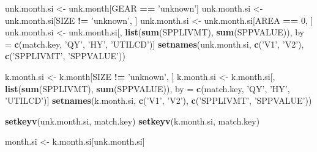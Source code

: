 \documentclass[]{article}
\newenvironment{Shaded}{\begin{snugshade}}{\end{snugshade}}
\newcommand{\KeywordTok}[1]{\textcolor[rgb]{0.13,0.29,0.53}{\textbf{#1}}}
\newcommand{\DecValTok}[1]{\textcolor[rgb]{0.00,0.00,0.81}{#1}}
\newcommand{\StringTok}[1]{\textcolor[rgb]{0.31,0.60,0.02}{#1}}
\newcommand{\OperatorTok}[1]{\textcolor[rgb]{0.81,0.36,0.00}{\textbf{#1}}}
\newcommand{\NormalTok}[1]{#1}
\begin{document}
\begin{Shaded}
\begin{Highlighting}[]
\NormalTok{  unk.month.si <-}\StringTok{ }\NormalTok{unk.month[GEAR }\OperatorTok{==}\StringTok{ 'unknown'}\NormalTok{]}
\NormalTok{  unk.month.si <-}\StringTok{ }\NormalTok{unk.month.si[SIZE }\OperatorTok{!=}\StringTok{ 'unknown'}\NormalTok{, ]}
\NormalTok{  unk.month.si <-}\StringTok{ }\NormalTok{unk.month.si[AREA }\OperatorTok{==}\StringTok{ }\DecValTok{0}\NormalTok{, ]}
\NormalTok{  unk.month.si <-}\StringTok{ }\NormalTok{unk.month.si[, }\KeywordTok{list}\NormalTok{(}\KeywordTok{sum}\NormalTok{(SPPLIVMT), }\KeywordTok{sum}\NormalTok{(SPPVALUE)), }
\NormalTok{                               by =}\StringTok{ }\KeywordTok{c}\NormalTok{(match.key, }\StringTok{'QY'}\NormalTok{, }\StringTok{'HY'}\NormalTok{, }\StringTok{'UTILCD'}\NormalTok{)]}
  \KeywordTok{setnames}\NormalTok{(unk.month.si, }\KeywordTok{c}\NormalTok{(}\StringTok{'V1'}\NormalTok{, }\StringTok{'V2'}\NormalTok{), }\KeywordTok{c}\NormalTok{(}\StringTok{'SPPLIVMT'}\NormalTok{, }\StringTok{'SPPVALUE'}\NormalTok{))}
  
\NormalTok{  k.month.si <-}\StringTok{ }\NormalTok{k.month[SIZE }\OperatorTok{!=}\StringTok{ 'unknown'}\NormalTok{, ]}
\NormalTok{  k.month.si <-}\StringTok{ }\NormalTok{k.month.si[, }\KeywordTok{list}\NormalTok{(}\KeywordTok{sum}\NormalTok{(SPPLIVMT), }\KeywordTok{sum}\NormalTok{(SPPVALUE)), }
\NormalTok{                           by =}\StringTok{ }\KeywordTok{c}\NormalTok{(match.key, }\StringTok{'QY'}\NormalTok{, }\StringTok{'HY'}\NormalTok{, }\StringTok{'UTILCD'}\NormalTok{)]}
  \KeywordTok{setnames}\NormalTok{(k.month.si, }\KeywordTok{c}\NormalTok{(}\StringTok{'V1'}\NormalTok{, }\StringTok{'V2'}\NormalTok{), }\KeywordTok{c}\NormalTok{(}\StringTok{'SPPLIVMT'}\NormalTok{, }\StringTok{'SPPVALUE'}\NormalTok{))}
  
  \KeywordTok{setkeyv}\NormalTok{(unk.month.si, match.key)}
  \KeywordTok{setkeyv}\NormalTok{(k.month.si,   match.key)}
  
\NormalTok{  month.si <-}\StringTok{ }\NormalTok{k.month.si[unk.month.si]}
  

\end{Highlighting}
\end{Shaded}
\end{document}
